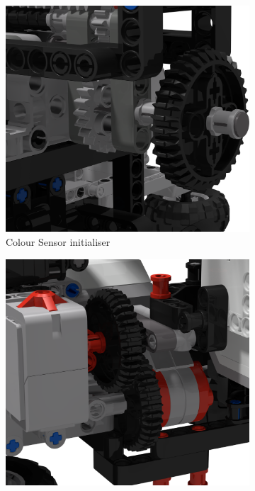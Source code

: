 \documentclass{report}
\begin{document}
	\begin{figure}[H]
		\centering
		\begin{subfigure}[b]{0.25\textwidth}
			\includegraphics[width=\textwidth]{Resources/Images/rdrInitialiser1.png}
			\caption{Colour Sensor initialiser}
			\label{fig:rdrInitialiser1}
		\end{subfigure}
		\hspace{10mm}
		\begin{subfigure}[b]{0.25\textwidth}
			\includegraphics[width=\textwidth]{Resources/Images/rdrInitialiser2.png}

\end{subfigure}
\end{figure}
\end{document}
